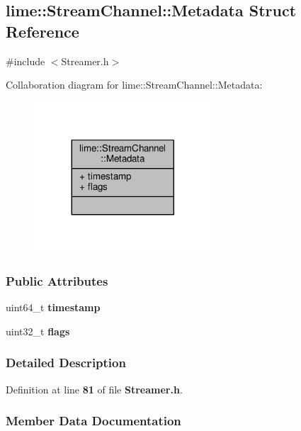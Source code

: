 \subsection{lime\+:\+:Stream\+Channel\+:\+:Metadata Struct Reference}
\label{structlime_1_1StreamChannel_1_1Metadata}


{\ttfamily \#include $<$Streamer.\+h$>$}



Collaboration diagram for lime\+:\+:Stream\+Channel\+:\+:Metadata\+:
\nopagebreak
\begin{figure}[H]
\begin{center}
\leavevmode
\includegraphics[width=188pt]{dd/d58/structlime_1_1StreamChannel_1_1Metadata__coll__graph}
\end{center}
\end{figure}
\subsubsection*{Public Attributes}
\begin{DoxyCompactItemize}
\item 
uint64\+\_\+t {\bf timestamp}
\item 
uint32\+\_\+t {\bf flags}
\end{DoxyCompactItemize}


\subsubsection{Detailed Description}


Definition at line {\bf 81} of file {\bf Streamer.\+h}.



\subsubsection{Member Data Documentation}
